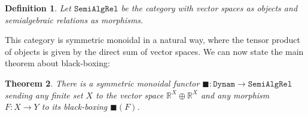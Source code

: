 \documentclass{compositionalityarticle}
\newcommand{\R}{\mathbb{R}}
\newcommand{\Dynam}{\mathtt{Dynam}}
\newcommand{\SemiAlgRel}{\mathtt{SemiAlgRel}}
\newcommand{\maps}{\colon}
\theoremstyle{plain}
\newtheorem{thm}{Theorem}
\newtheorem{defn}[thm]{Definition}
\theoremstyle{remark}
\begin{document}
\begin{defn}
Let $\SemiAlgRel$ be the category with vector spaces as objects and semialgebraic relations as morphisms.
\end{defn}

This category is symmetric monoidal in a natural way, where the tensor product of objects is given by the direct sum of vector spaces.   We can now state the main theorem about black-boxing:

\begin{thm}
\label{thm:black}
There is a symmetric monoidal functor $\blacksquare \maps \Dynam \to \SemiAlgRel$
sending any finite set $X$ to the vector space $\R^X \oplus \R^X$ and any morphism $F \maps X \to Y$ to its black-boxing $\blacksquare(F)$.
\end{thm}
\end{document}
